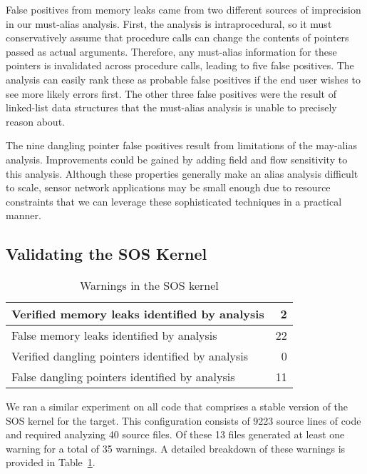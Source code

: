 \smallskip{}



False positives from memory leaks came from two different sources of
imprecision in our must-alias analysis.
%
First, the analysis is intraprocedural, so it must conservatively assume
that procedure calls can change the contents of pointers passed as
actual arguments.  
%
Therefore, any must-alias information for these pointers is invalidated
across procedure calls, leading to five false positives.
%
The analysis can easily rank these as probable false positives if the
end user wishes to see more likely errors first.  
%
The other three false positives were the result of linked-list data
structures that the must-alias analysis is unable to precisely reason
about.  



\smallskip{}



The nine dangling pointer false positives result from limitations of the
may-alias analysis.  
%
Improvements could be gained by adding field and flow sensitivity to
this analysis.
%
Although these properties generally make an alias analysis difficult to
scale, sensor network applications may be small enough due to resource
constraints that we can leverage these sophisticated techniques in a
practical manner.


\subsection{Validating the SOS Kernel}



\begin{table}
\caption{Warnings in the SOS kernel}
%
\label{tab:kernel}
\centering 
\begin{tabular}{| l | r |}
    \hline 
    Verified memory leaks identified by analysis & 2 \\
    \hline
    False memory leaks identified by analysis & 22 \\
    \hline 
    Verified dangling pointers identified by analysis & 0 \\
    \hline 
    False dangling pointers identified by analysis & 11 \\
    \hline 
\end{tabular} 
%
\end{table}


We ran a similar experiment on all code that comprises a stable version of
the SOS kernel for the  target.  
%
This configuration consists of 9223 source lines of code and required
analyzing 40 source files.  
%
Of these 13 files generated at least one warning for a total of 35
warnings.  
%
A detailed breakdown of these warnings is provided in
Table~\ref{tab:kernel}.



